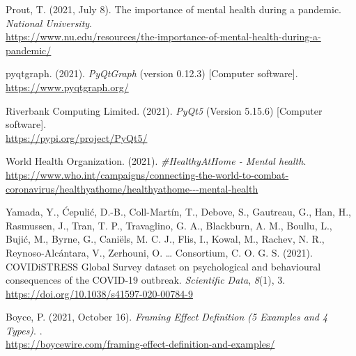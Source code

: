 \documentclass[fontsize=11pt]{article}
\begin{document}
    \hangindent=0.7cm \noindent
    Prout, T. (2021, July 8). The importance of mental health during a pandemic. \textit{National University}. \\ \url{https://www.nu.edu/resources/the-importance-of-mental-health-during-a-pandemic/}

    \hangindent=0.7cm \noindent
    pyqtgraph. (2021). \textit{PyQtGraph} (version 0.12.3) [Computer software]. \\
    \url{https://www.pyqtgraph.org/}

    \hangindent=0.7cm \noindent
    Riverbank Computing Limited. (2021). \textit{PyQt5} (Version 5.15.6) [Computer software]. \\
    \url{https://pypi.org/project/PyQt5/}

    \hangindent=0.7cm \noindent
    World Health Organization. (2021). \textit{\#HealthyAtHome - Mental health}. \\ \url{https://www.who.int/campaigns/connecting-the-world-to-combat-coronavirus/healthyathome/healthyathome---mental-health}

    \hangindent=0.7cm \noindent
    Yamada, Y., Ćepulić, D.-B., Coll-Martín, T., Debove, S., Gautreau, G., Han, H., Rasmussen, J., Tran, T. P., Travaglino, G. A., Blackburn, A. M., Boullu, L., Bujić, M., Byrne, G., Caniëls, M. C. J., Flis, I., Kowal, M., Rachev, N. R., Reynoso-Alcántara, V., Zerhouni, O. … Consortium, C. O. G. S. (2021). COVIDiSTRESS Global Survey dataset on psychological and behavioural consequences of the COVID-19 outbreak. \textit{Scientific Data}, \textit{8}(1), 3. \\
    \url{https://doi.org/10.1038/s41597-020-00784-9}
    
    \hangindent=0.7cm \noindent
    Boyce, P. (2021, October 16). \textit{Framing Effect Definition (5 Examples and 4 Types)}. . \\
    \url{https://boycewire.com/framing-effect-definition-and-examples/}
    
\end{document}
